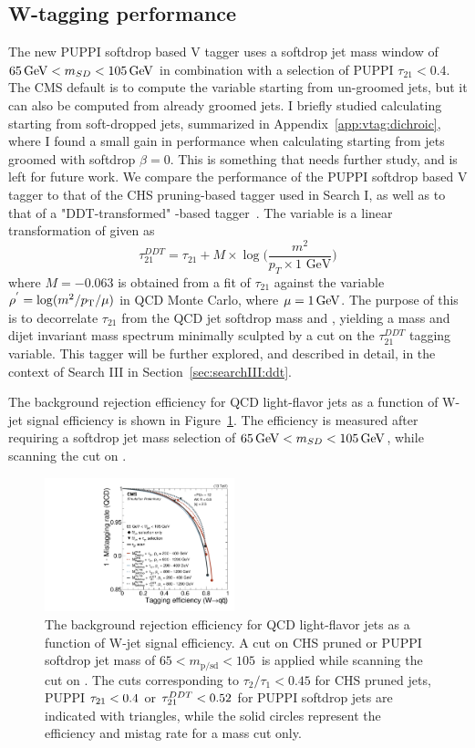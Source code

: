 \subsection{W-tagging performance}
\label{sec:searchII:vtagperf}
The new PUPPI softdrop based V tagger uses a softdrop jet mass window of $65 \,\text{Ge\hspace{-.08em}V} < m_{SD} < 105 \,\text{Ge\hspace{-.08em}V}$ in combination with a selection of PUPPI $\tau_{21}<0.4$. The CMS default is to compute the \nsubj variable starting from un-groomed jets, but it can also be computed from already groomed jets. I briefly studied calculating \nsubj starting from soft-dropped jets, summarized in Appendix~\ref{app:vtag:dichroic}, where I found a small gain in performance when calculating \nsubj starting from jets groomed with softdrop $\beta=0$. This is something that needs further study, and is left for future work. We compare the performance of the PUPPI softdrop based V tagger to that of the CHS pruning-based tagger used in Search I, as well as to that of a "DDT-transformed" \nsubj-based tagger~\cite{Dolen:2016kst}. The \ddt variable is a linear transformation of \nsubj given as
\begin{equation}
\label{eq:searchII:ddt}
\tau_{21}^{DDT} = \tau_{21} + M \times \log \bigg( \frac{m^2}{p_T \times 1 \textrm{ GeV}}\bigg)
\end{equation}
where $M=-0.063$ is obtained from a fit of $\tau_{21}$ against the variable $\rho^{'}=\log(m^2/p_{\mathrm{T}}/\mu)$ in QCD Monte Carlo, where $\mu = 1 \,\text{Ge\hspace{-.08em}V}$.
The purpose of this is to decorrelate $\tau_{21}$ from the QCD jet softdrop mass and \PT, yielding a mass and dijet invariant mass spectrum minimally sculpted by a cut on the $\tau_{21}^{DDT}$ tagging variable. This tagger will be further explored, and described in detail, in the context of Search III in Section~\ref{sec:searchIII:ddt}.\par
The background rejection efficiency for QCD light-flavor jets as a function of W-jet signal efficiency is shown in Figure~\ref{fig:searchII:roc}.
The efficiency is measured after requiring a softdrop jet mass selection of $65 \,\text{Ge\hspace{-.08em}V} < m_{SD} < 105 \,\text{Ge\hspace{-.08em}V}$, while scanning the cut on \nsubj.
\begin{figure}[h!]
\centering
\includegraphics[width=0.49\textwidth]{figures/vtagging/JME-16-003/BoostedW/roc_WqqvsQCD_2bins.pdf}
\caption{The background rejection efficiency for QCD light-flavor jets as a function of W-jet signal efficiency. A cut on CHS pruned or PUPPI softdrop jet mass of $65<m_{\mathrm{p/sd}}<105$~\GeV is applied while scanning the cut on \nsubj. The cuts corresponding to $\tau_2/\tau_1 < 0.45$ for CHS pruned jets, PUPPI $\tau_{21} < 0.4$ or $\tau_{21}^{DDT}<0.52$ for PUPPI softdrop jets are indicated with triangles, while the solid circles represent the efficiency and mistag rate for a mass cut only.}
\label{fig:searchII:roc}
\end{figure}
